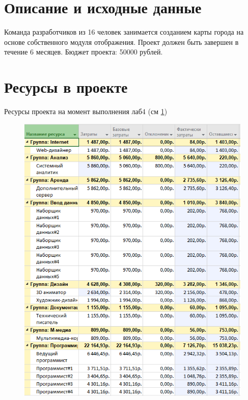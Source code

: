 \section{Описание и исходные данные}
Команда разработчиков из 16 человек занимается созданием карты города на основе собственного модуля отображения. 
Проект должен быть завершен в течение 6 месяцев. 
Бюджет проекта: 50000 рублей.

\section{Ресурсы в проекте}
Ресурсы проекта на момент выполнения лаб4 (см \ref{fig:44})
\begin{figure}[H]
	\centering
	\includegraphics[width=0.7\linewidth]{src/4_4}
	\caption{}
	\label{fig:44}
\end{figure}

